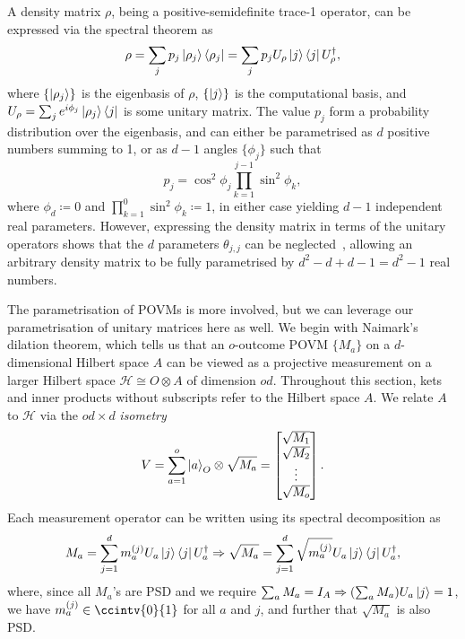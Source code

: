 \documentclass[10pt, a4paper]{article}
\numberwithin{equation}{section} %
\theoremstyle{definition}
\theoremstyle{plain}
\newcommand{\?}{\mathrel{?}} %
\newcommand{\Hs}{\mathcal{H}} %
\begin{document}
                        A density matrix \(\rho\), being a positive-semidefinite trace-1 operator, can be expressed via the spectral theorem as
                        \begin{equation}
                          \rho = \sum_j p_j \ket{\rho_j}\bra{\rho_j} = \sum_j p_j U_{\rho}\ket{j}\bra{j}U_{\rho}^{\dagger},
                        \end{equation}
                        where \(\{\ket{\rho_j}\}\) is the eigenbasis of \(\rho\), \(\{\ket{j}\}\) is the computational basis, and \(U_{\rho} = \sum_{j} e^{i\phi_j} \ket{\rho_j}\bra{j}\) is some unitary matrix. The value \(p_j\) form a probability distribution over the eigenbasis, and can either be parametrised as \(d\) positive numbers summing to 1, or as \(d-1\) angles \(\{\phi_j\}\) such that
                        \begin{equation}
                          p_j = \cos^2\phi_j\prod_{k=1}^{j-1}\sin^2\phi_k,
                        \end{equation}
                        where \(\phi_d \coloneqq 0\) and \(\prod_{k=1}^{0}\sin^2\phi_k \coloneqq 1\), in either case yielding \(d-1\) independent real parameters. However, expressing the density matrix in terms of the unitary operators shows that the \(d\) parameters \(\theta_{j,j}\) can be neglected~\cite{CompositeParam}, allowing an arbitrary density matrix to be fully parametrised by \(d^2 -d + d - 1 = d^2-1\) real numbers.

                        The parametrisation of POVMs is more involved, but we can leverage our parametrisation of unitary matrices here as well. We begin with Naimark's dilation theorem, which tells us that an \(o\)-outcome POVM \(\{M_a\}\) on a \(d\)-dimensional Hilbert space \(A\) can be viewed as a projective measurement on a larger Hilbert space \(\Hs \cong O \otimes A\) of dimension \(od\). Throughout this section, kets and inner products without subscripts refer to the Hilbert space \(A\). We relate \(A\) to \(\Hs\) via the \(od \times d\) \emph{isometry}
                        \begin{equation}
                          V = \sum_{a=1}^o \ket{a}_O \otimes \sqrt{M_a} = \begin{bmatrix} \sqrt{M_1} \\ \sqrt{M_2} \\ \vdots \\ \sqrt{M_o} \end{bmatrix}.
                        \end{equation}
                        Each measurement operator can be written using its spectral decomposition as
                        \begin{equation}
                          M_a = \sum_{j=1}^d m_a^{(j)} U_a \ket{j}\bra{j} U_a^{\dagger} \Rightarrow \sqrt{M_a} = \sum_{j=1}^d \sqrt{m_a^{(j)}} U_a \ket{j}\bra{j} U_a^{\dagger},
                        \end{equation}
                        where, since all \(M_a\)'s are PSD and we require \(\sum_a M_a = I_A \Rightarrow (\sum_a M_a) U_a\ket{j} = 1\), we have \(m_a^{(j)}\in\ccintv{0}{1}\) for all \(a\) and \(j\), and further that \(\sqrt{M_a}\) is also PSD\@.
\end{document}
